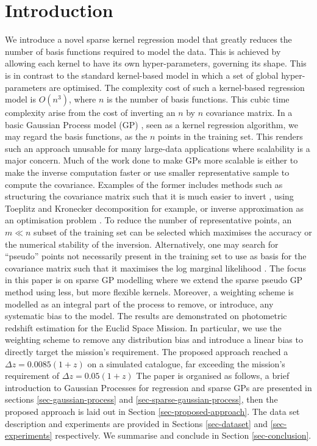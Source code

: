 \documentclass[useAMS,usenatbib,fleqn]{mn2e}
\begin{document}
\section{Introduction}
We introduce a novel sparse kernel regression model that greatly reduces the number of basis functions required to model the data. This is achieved by allowing each kernel to have its own hyper-parameters, governing its shape. This is in contrast to the standard kernel-based model in which a set of global hyper-parameters are optimised. The complexity cost of such a kernel-based regression model is $O(n^{3})$, where $n$ is the number of basis functions. This cubic time complexity arise from the cost of inverting an $n$ by $n$ covariance matrix. In a basic Gaussian Process model (GP) \cite{rasmussen+williams}, seen as a kernel regression algorithm, we may regard the basis functions, as the $n$ points in the training set. This renders such an approach unusable for many large-data applications where scalability is a major concern. Much of the work done to make GPs more scalable \cite{sparseGPcitations} is either to make the inverse computation faster or use smaller representative sample to compute the covariance. Examples of the former includes methods such as structuring the covariance matrix such that it is much easier to invert \cite{}, using Toeplitz and Kronecker decomposition for example, or inverse approximation as an optimisation problem \cite{}. To reduce the number of representative points, an $m \ll n$ subset of the training set can be selected which maximises the accuracy or the numerical stability of the inversion. Alternatively, one may search for ``pseudo'' points not necessarily present in the training set to use as basis for the covariance matrix such that it maximises the log marginal likelihood \cite{}. The focus in this paper is on sparse GP modelling where we extend the sparse pseudo GP method using less, but more flexible kernels. Moreover, a weighting scheme is modelled as an integral part of the process to remove, or introduce, any systematic bias to the model. The results are demonstrated on photometric redshift estimation for the Euclid Space Mission. In particular, we use the weighting scheme to remove any distribution bias and introduce a linear bias to directly target the mission's requirement. The proposed approach reached a $\Delta z = 0.0085(1+z)$ on a simulated catalogue, far exceeding the mission's requirement of $\Delta z = 0.05(1+z)$ The paper is organised as follows, a brief introduction to Gaussian Processes for regression and sparse GPs are presented in sections \ref{sec-gaussian-process} and \ref{sec-sparse-gaussian-process},  then the proposed approach is laid out in Section \ref{sec-proposed-approach}. The data set description and experiments are provided in Sections \ref{sec-dataset} and \ref{sec-experiments} respectively. We summarise and conclude in Section \ref{sec-conclusion}.
\end{document}
